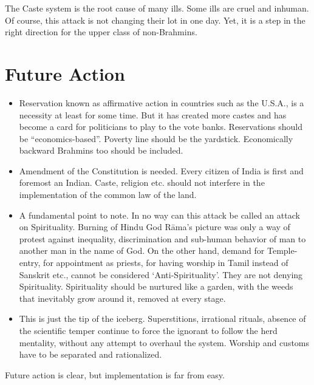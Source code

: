 The Caste system is the root cause of many ills. Some ills are cruel and inhuman. Of course, this attack is not changing their lot in one day. Yet, it is a step in the right direction for the upper class of non-Brahmins.


\section*{Future Action}

\begin{itemize}
\item Reservation known as affirmative action in countries such as the U.S.A., is a necessity at least for some time. But it has created more castes and has become a card for politicians to play to the vote banks. Reservations should be “economics-based”. Poverty line should be the yardstick. Economically backward Brahmins too should be included.

 \item Amendment of the Constitution is needed. Every citizen of India is first and foremost an Indian. Caste, religion etc. should not interfere in the implementation of the common law of the land.

 \item A fundamental point to note. In no way can this attack be called an attack on Spirituality. Burning of Hindu God Rāma’s picture was only a way of protest against inequality, discrimination and sub-human behavior of man to another man in the name of God. On the other hand, demand for Temple-entry, for appointment as priests, for having worship in Tamil instead of Sanskrit etc., cannot be considered ‘Anti-Spirituality’. They are not denying Spirituality. Spirituality should be nurtured like a garden, with the weeds that inevitably grow around it, removed at every stage.

 \item This is just the tip of the iceberg. Superstitions, irrational rituals, absence of the scientific temper continue to force the ignorant to follow the herd mentality, without any attempt to overhaul the system. Worship and customs have to be separated and rationalized.

\end{itemize}

Future action is clear, but implementation is far from easy.

